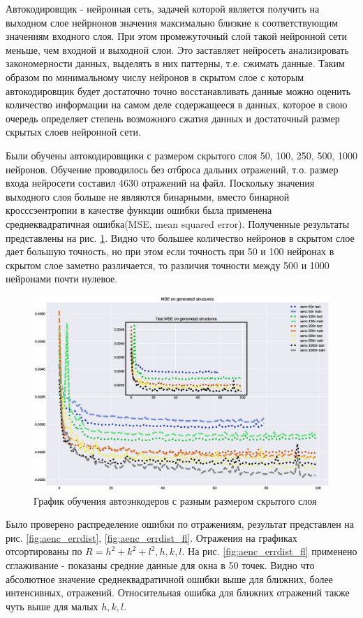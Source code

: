 \documentclass{article}
\begin{document}
Автокодировщик - нейронная сеть, задачей которой является получить на выходном слое нейрнонов значения максимально близкие к соответствующим значениям входного слоя. При этом промежуточный слой такой нейронной сети меньше, чем входной и выходной слои. Это заставляет нейросеть анализировать закономерности данных, выделять в них паттерны, т.е. сжимать данные. Таким образом по минимальному числу нейронов в скрытом слое с которым автокодировщик будет достаточно точно восстанавливать данные можно оценить количество информации на самом деле содержащееся в данных, которое в свою очередь определяет степень возможного сжатия данных и достаточный размер скрытых слоев нейронной сети.

Были обучены автокодировщики с размером скрытого слоя 50, 100, 250, 500, 1000 нейронов. Обучение проводилось без отброса дальних отражений, т.о. размер входа нейросети составил 4630 отражений на файл. Поскольку значения выходного слоя больше не являются бинарными, вместо бинарной кросссэентропии в качестве функции ошибки была применена среднеквадратичная ошибка(MSE, mean squared error). Полученные результаты представлены на рис. \ref{fig:loss_aenc}. Видно что большее количество нейронов в скрытом слое дает большую точность, но при этом если точность при 50 и 100 нейронах в скрытом слое заметно различается, то различия точности между 500 и 1000 нейронами почти нулевое.

\begin{figure}[!htp]
\centering
\includegraphics[width=\linewidth]{imgs/loss-aenc.eps}
\caption{График обучения автоэнкодеров с разным размером скрытого слоя}
\label{fig:loss_aenc}
\end{figure}

Было проверено распределение ошибки по отражениям, результат представлен на рис. \ref{fig:aenc_errdist}, \ref{fig:aenc_errdist_fl}. Отражения на графиках отсортированы по $R=h^2+ k^2 + l^2, h,k,l$. На рис. \ref{fig:aenc_errdist_fl} применено сглаживание - показаны средние данные для окна в 50 точек. Видно что абсолютное значение среднеквадратичной ошибки выше для ближних, более интенсивных, отражений. Относительная ошибка для ближних отражений также чуть выше для малых $h,k,l$.
\end{document}
